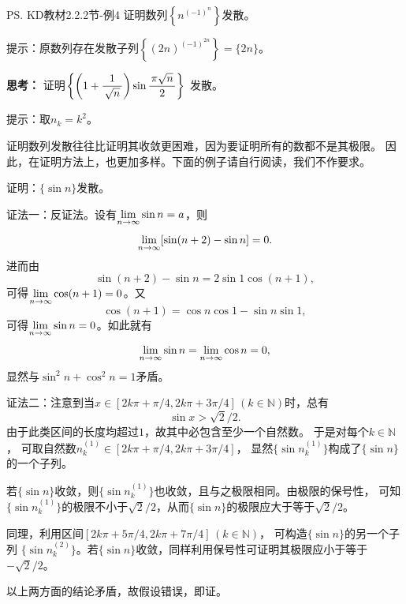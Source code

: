 \bs
\egz \ps{KD教材2.2.2节-例4}
证明数列$\left\{n^{(-1)^n}\right\}$发散。

提示：原数列存在发散子列$\left\{(2n)^{(-1)^{2n}}\right\}=\{2n\}$。

\bs
{\bf 思考：} 证明$\left\{\left(1+\displaystyle\frac{\,{1}\,}{\,{\sqrt n}\,}\right)
\sin\displaystyle\frac{\,{\pi\sqrt n}\,}{\,{2}\,}\right\}$
发散。

\ifhint
提示：取$n_k=k^2$。 
\fi

\begin{shaded}
	证明数列发散往往比证明其收敛更困难，因为要证明所有的数都不是其极限。
	因此，在证明方法上，也更加多样。下面的例子请自行阅读，我们不作要求。

	\egz 证明：$\{\sin n\}$发散。

	
	证法一：反证法。设有$\lim\limits_{n\to\infty}\sin n=a$，则
	$$\lim\limits_{n\to\infty}[\sin(n+2)-\sin n]=0.$$
	进而由
	$$\sin(n+2)-\sin n=2\sin 1\cos(n+1),$$
	可得$\lim\limits_{n\to\infty}\cos(n+1)=0$。又
	$$\cos(n+1)=\cos n\cos 1-\sin n\sin 1,$$
	可得$\lim\limits_{n\to\infty}\sin n=0$。如此就有
	$$\lim\limits_{n\to\infty}\sin n=\lim\limits_{n\to\infty}\cos n=0,$$
	显然与$\sin^2n+\cos^2n=1$矛盾。\fin
	
	证法二：注意到当$x\in[2k\pi+\pi/4,2k\pi+3\pi/4]\,
	(k\in\mathbb{N})$时，总有
	$$\sin x>\sqrt2/2.$$
	由于此类区间的长度均超过$1$，故其中必包含至少一个自然数。
	于是对每个$k\in\mathbb{N}$，
	可取自然数$n^{(1)}_k\in[2k\pi+\pi/4,2k\pi+3\pi/4]$，
	显然$\{\sin{n^{(1)}_k}\}$构成了$\{\sin
	n\}$的一个子列。
	
	若$\{\sin n\}$收敛，则$\{\sin{n^{(1)}_k}\}$也收敛，且与之极限相同。由极限的保号性，
	可知$\{\sin{n^{(1)}_k}\}$的极限不小于$\sqrt2/2$，从而$\{\sin
	n\}$的极限应大于等于$\sqrt2/2$。
	
	同理，利用区间$[2k\pi+5\pi/4,2k\pi+7\pi/4]\,(k\in\mathbb{N})$，
	可构造$\{\sin n\}$的另一个子列 
	$\{\sin{n^{(2)}_k}\}$。若$\{\sin n\}$收敛，同样利用保号性可证明其极限应小于等于$-\sqrt2/2$。
	
	以上两方面的结论矛盾，故假设错误，即证。\fin
\end{shaded}

